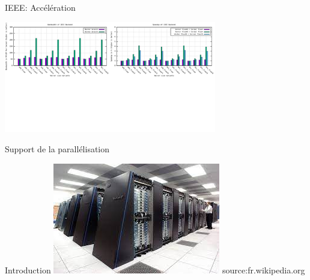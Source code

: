 \documentclass{beamer}
\begin{document}
\begin{frame}{IEEE: Accélération}

  \centering\includegraphics[width=350px]{../ressources/vm_ieee.png}
  
\end{frame}

\begin{frame}{Support de la parallélisation}

  \begin{block}{Introduction}
    \includegraphics[width=0.6\linewidth]{../ressources/index.jpeg}
    source:fr.wikipedia.org
  \end{block}

\end{frame}
\end{document}
